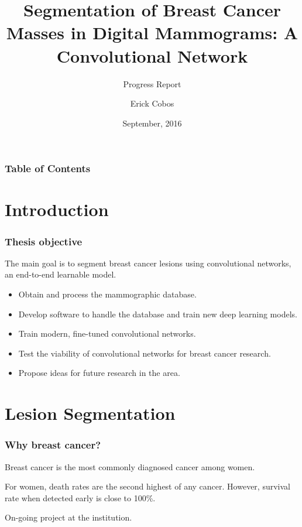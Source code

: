 \documentclass{beamer}
\title[Progress Report]{Segmentation of Breast Cancer Masses in Digital Mammograms: A Convolutional Network}
\subtitle[Report]{Progress Report}
\author[Cobos] {Erick Cobos\inst{1}}
\date[September, 2016]{September, 2016}
\institute[Tec de Monterrey]{
	\inst{1} Centro de Sistemas Intelligentes \\ Tecnologico de Monterrey
}
\begin{document}
	\begin{frame}
		\titlepage
	\end{frame}
		
	\begin{frame}
		\frametitle{Table of Contents}
		\tableofcontents[currentsection]
    \end{frame}
    
    \section[Introduction]{Introduction}
    \begin{frame}
		\frametitle{Thesis objective}
			The main goal is to segment breast cancer lesions using convolutional networks, an end-to-end learnable model.
		
		\begin{itemize}
			\item Obtain and process the mammographic database. %
			\item Develop software to handle the database and train new deep learning models.
			\item Train modern, fine-tuned convolutional networks.%
			\item Test the viability of convolutional networks for breast cancer research.
			\item Propose ideas for future research in the area.
		\end{itemize}
	\end{frame}

    \section[Lesion Segmentation]{Lesion Segmentation}
    \begin{frame}
     	\frametitle{Why breast cancer?}
     		Breast cancer is the most commonly diagnosed cancer among women.
     		
     		For women, death rates are the second highest of any cancer. However, survival rate when detected early is close to 100\%.
     		
     		On-going project at the institution.
    \end{frame}
\end{document}
